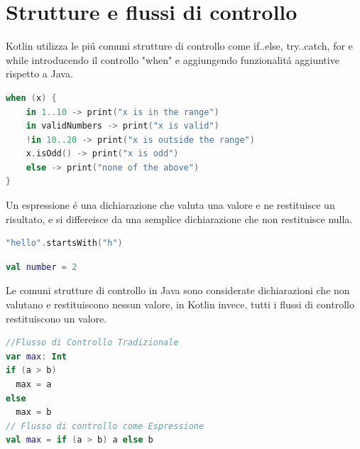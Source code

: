\section{Strutture e flussi di controllo}
Kotlin utilizza le pi\'u comuni strutture di controllo come if..else, try..catch, for e while introducendo il controllo "when" e aggiungendo funzionalit\'a aggiuntive rispetto a Java.

\begin{lstlisting}[language=kotlin,caption={Sintatti When Kotlin}]
when (x) {
    in 1..10 -> print("x is in the range")
    in validNumbers -> print("x is valid")
    !in 10..20 -> print("x is outside the range")
    x.isOdd() -> print("x is odd")
    else -> print("none of the above")
}
\end{lstlisting}
Un espressione \'e una dichiarazione che valuta una valore e ne restituisce un risultato, e si differeisce da una semplice dichiarazione che non restituisce nulla.

\begin{lstlisting}[language=kotlin,caption={Espressione - Flussi di Controllo}]
"hello".startsWith("h")
\end{lstlisting}

\begin{lstlisting}[language=kotlin,caption={Dischiarazione - Flussi di Controllo}]
val number = 2
\end{lstlisting}

Le comuni strutture di controllo in Java sono considerate dichiarazioni che non valutano e restituiscono nessun valore, in Kotlin invece, tutti i flussi di controllo restituiscono un valore.

\begin{lstlisting}[language=kotlin,caption={Esempio espresioni in Kotlin}]
//Flusso di Controllo Tradizionale
var max: Int
if (a > b)
  max = a
else
  max = b
// Flusso di controllo come Espressione
val max = if (a > b) a else b
\end{lstlisting}


